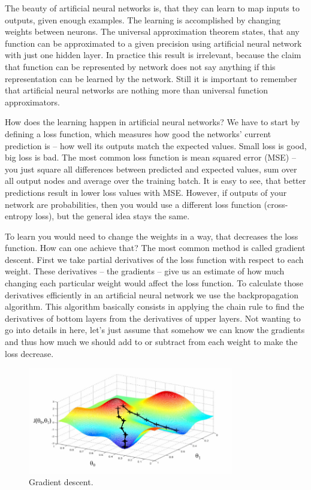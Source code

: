\documentclass[a4paper,11pt]{article}
\begin{document}
\newpage

The beauty of artificial neural networks is, that they can learn to map inputs to outputs, given enough examples. The learning is accomplished by changing weights between neurons. The universal approximation theorem states, that any function can be approximated to a given precision using artificial neural network with just one hidden layer. In practice this result is irrelevant, because the claim that function can be represented by network does not say anything if this representation can be learned by the network. Still it is important to remember that artificial neural networks are nothing more than universal function approximators.

How does the learning happen in artificial neural networks? We have to start by defining a loss function, which measures how good the networks' current prediction is -- how well its outputs match the expected values. Small loss is good, big loss is bad. The most common loss function is mean squared error (MSE) -- you just square all differences between predicted and expected values, sum over all output nodes and average over the training batch. It is easy to see, that better predictions result in lower loss values with MSE. However, if outputs of your network are probabilities, then you would use a different loss function (cross-entropy loss), but the general idea stays the same.

To learn you would need to change the weights in a way, that decreases the loss function. How can one achieve that? The most common method is called gradient descent. First we take partial derivatives of the loss function with respect to each weight. These derivatives -- the gradients -- give us an estimate of how much changing each particular weight would affect the loss function. To calculate those derivatives efficiently in an artificial neural network we use the backpropagation algorithm. This algorithm basically consists in applying the chain rule to find the derivatives of bottom layers from the derivatives of upper layers. Not wanting to go into details in here, let's just assume that somehow we can know the gradients and thus how much we should add to or subtract from each weight to make the loss decrease.

\begin{figure}[h]
	\centering
	\includegraphics[width=0.8\textwidth]{gradient_descent.png}
	\caption{Gradient descent.}
	\label{gradient_descent}
%
%
\end{figure}
\end{document}
